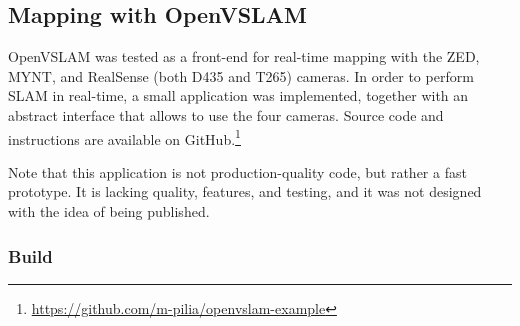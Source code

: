 \documentclass[11pt, letterpaper, twoside]{article}
\begin{document}
\subsection{Mapping with OpenVSLAM}

OpenVSLAM was tested as a front-end for real-time mapping with the ZED, MYNT,
and RealSense (both D435 and T265) cameras. In order to perform SLAM in
real-time, a small application was implemented, together with an abstract
interface that allows to use the four cameras. Source code and instructions are
available on GitHub.\footnote{\url{https://github.com/m-pilia/openvslam-example}}

Note that this application is not production-quality code, but rather a fast
prototype. It is lacking quality, features, and testing, and it was not
designed with the idea of being published.

\subsubsection{Build}
\end{document}
